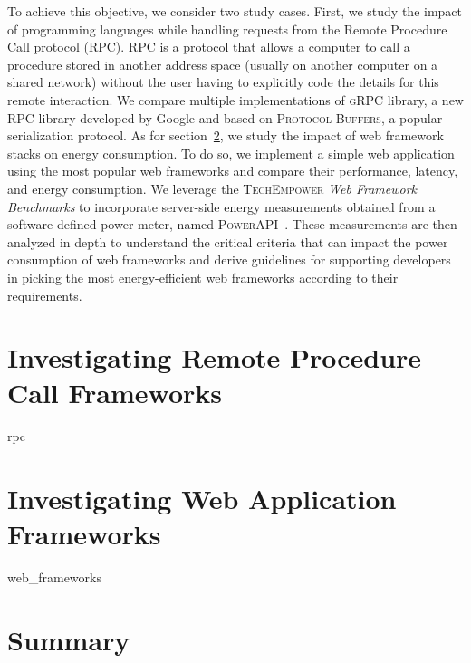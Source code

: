 To achieve this objective, we consider two study cases.
First, we study the impact of programming languages while handling requests from the Remote Procedure Call protocol (RPC).
RPC is a protocol that allows a computer to call a procedure stored in another address space (usually on another computer on a shared network) without the user having to explicitly code the details for this remote interaction.
We compare multiple implementations of \textsc{gRPC} library, a new RPC library developed by Google and based on \textsc{Protocol Buffers}, a popular serialization protocol.
As for section~\ref{sec:webframework}, we study the impact of web framework stacks on energy consumption. To do so, we implement a simple web application using the most popular web frameworks and compare their performance, latency, and energy consumption.  We leverage the \textsc{TechEmpower} \emph{Web Framework Benchmarks} to incorporate server-side energy measurements obtained from a software-defined power meter, named \textsc{PowerAPI}~\cite{fieni2020smartwatts}.
These measurements are then analyzed in depth to understand the critical criteria that can impact the power consumption of web frameworks and derive guidelines for supporting developers in picking the most energy-efficient web frameworks according to their requirements.


\section{Investigating Remote Procedure Call Frameworks}
{rpc}

\section{Investigating Web Application Frameworks}\label{sec:webframework}

{web_frameworks}

\section{Summary }
